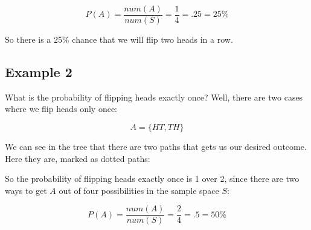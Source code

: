 \documentclass[../../../main.tex]{subfiles}
\begin{document}
\begin{equation*}
  P(A) = \frac{num(A)}{num(S)} = \frac{1}{4} = .25 = 25\%
\end{equation*}

\noindent
So there is a 25\% chance that we will flip two heads in a row.


\subsection{Example 2}

What is the probability of flipping heads exactly once? Well, there are two cases where we flip heads only once:

\begin{equation*}
  A = \{ HT, TH \}
\end{equation*}

\noindent
We can see in the tree that there are two paths that gets us our desired outcome. Here they are, marked as dotted paths:

\begin{center}
\end{center}

\noindent
So the probability of flipping heads exactly once is 1 over 2, since there are two ways to get $A$ out of four possibilities in the sample space $S$:

\begin{equation*}
  P(A) = \frac{num(A)}{num(S)} = \frac{2}{4} = .5 = 50\%
\end{equation*}
\end{document}
